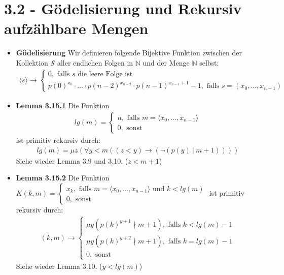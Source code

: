 \documentclass{scrartcl}
\newcommand{\goedel}[1]{\langle#1\rangle}
\begin{document}
\section*{3.2 - Gödelisierung und Rekursiv aufzählbare Mengen}
\begin{itemize}
    \item{\textbf{Gödelisierung}} Wir definieren folgende Bijektive Funktion zwischen der Kollektion $\mathcal{S}$ aller endlichen Folgen in $\mathbb{N}$ und der Menge $\mathbb{N}$ selbst:
    \begin{align*}
        \goedel{s} \to 
        \begin{cases}
        0, \text{ falls $s$ die leere Folge ist}\\
        p(0)^{x_0} \cdot \hdots \cdot p(n-2)^{x_{n-2}} \cdot p(n-1)^{x_{n-1}+1} - 1, \text{ falls } s = (x_0, \hdots, x_{n-1})
        \end{cases}
    \end{align*}
    \item{\textbf{Lemma 3.15.1}} Die Funktion 
    \begin{align*}
    lg(m) = 
    \begin{cases}
    n, \text{ falls } m = \goedel{x_0, \hdots, x_{n-1}}\\
    0, \text{ sonst}
    \end{cases}    
    \end{align*} ist primitiv rekursiv durch:
    \begin{align*}
        lg(m) = \mu z (\forall y < m ((z < y) \rightarrow (\neg (p(y)\ |\ m+1))))
    \end{align*}
    Siehe wieder Lemma 3.9 und 3.10. ($z < m+1$)
    \item{\textbf{Lemma 3.15.2}} Die Funktion $K(k,m) = 
    \begin{cases}
    x_k, \text{ falls $m = \goedel{x_0, \hdots, x_{n-1}}$ und $k < lg(m)$}\\
    0, \text{ sonst }
    \end{cases}$
    ist primitiv rekursiv durch:
    \begin{align*}
        (k,m) 
        \to 
        \begin{cases}
        \mu y(p(k)^{y+1} \nmid m+1), \text{ falls } k < lg(m) - 1\\
        \mu y(p(k)^{y+2} \nmid m+1), \text{ falls } k = lg(m) - 1\\
        0, \text{ sonst}
        \end{cases}
    \end{align*}
    Siehe wieder Lemma 3.10. ($y < lg(m)$)
    

\end{itemize}
\end{document}
